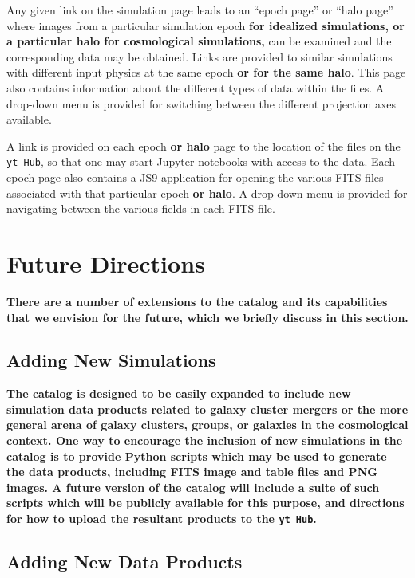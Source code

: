 \documentclass{emulateapj}
\newcommand{\code}[1]{\texttt{#1}}
\begin{document}
Any given link on the simulation page leads to an ``epoch page'' or ``halo page'' where images from a particular simulation epoch {\bf for idealized simulations, or a particular halo for cosmological simulations,} can be examined and the corresponding data may be obtained. Links are provided to similar simulations with different input physics at the same epoch {\bf or for the same halo}. This page also contains information about the different types of data within the files. A drop-down menu is provided for switching between the different projection axes available.

A link is provided on each epoch {\bf or halo} page to the location of the files on the \code{yt Hub}, so that one may start Jupyter notebooks with access to the data. Each epoch page also contains a JS9 application for opening the various FITS files associated with that particular epoch {\bf or halo}. A drop-down menu is provided for navigating between the various fields in each FITS file.

\section{Future Directions}\label{sec:future}

{\bf There are a number of extensions to the catalog and its capabilities that we envision for the future, which we briefly discuss in this section.}

\subsection{Adding New Simulations}\label{sec:new_sims}

{\bf The catalog is designed to be easily expanded to include new simulation data products related to galaxy cluster mergers or the more general arena of galaxy clusters, groups, or galaxies in the cosmological context. One way to encourage the inclusion of new simulations in the catalog is to provide Python scripts which may be used to generate the data products, including FITS image and table files and PNG images. A future version of the catalog will include a suite of such scripts which will be publicly available for this purpose, and directions for how to upload the resultant products to the \code{yt Hub}.} 

\subsection{Adding New Data Products}\label{sec:new_data}
\end{document}
